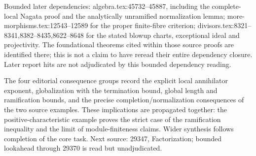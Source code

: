Bounded later dependencies: algebra.\AlgebraIdentifierBreak{}tex:\AlgebraIdentifierBreak{}45732--\AlgebraIdentifierBreak{}45887, including the complete-local Nagata proof and the analytically unramified normalization lemma; more-\AlgebraIdentifierBreak{}morphisms.\AlgebraIdentifierBreak{}tex:\AlgebraIdentifierBreak{}12543--\AlgebraIdentifierBreak{}12589 for the proper finite-fibre criterion; divisors.\AlgebraIdentifierBreak{}tex:\AlgebraIdentifierBreak{}8321--\AlgebraIdentifierBreak{}8341,\AlgebraIdentifierBreak{}8382--\AlgebraIdentifierBreak{}8435,\AlgebraIdentifierBreak{}8622--\AlgebraIdentifierBreak{}8648 for the stated blowup charts, exceptional ideal and projectivity. The foundational theorems cited within those source proofs are identified there; this is not a claim to have reread their entire dependency closure. Later report hits are not adjudicated by this bounded dependency reading.

The four editorial consequence groups record the explicit local annihilator exponent, globalization with the termination bound, global length and ramification bounds, and the precise completion/normalization consequences of the two source examples. These implications are propagated together: the positive-characteristic example proves the strict case of the ramification inequality and the limit of module-finiteness claims. Wider synthesis follows completion of the core task. Next source: 29347, Factorization; bounded lookahead through 29370 is read but unadjudicated.
